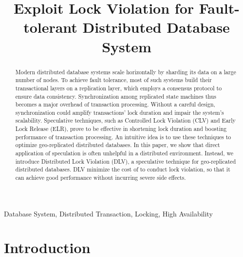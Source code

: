 \documentclass[conference]{IEEEtran}
\begin{document}
\title{Exploit Lock Violation for Fault-tolerant Distributed Database System}


\author{
\and
{}
}

\maketitle

\begin{abstract}
Modern distributed database systems scale horizontally by sharding its data on a large number of nodes.
To achieve fault tolerance, most of such systems build their transactional layers on a replication layer,
which employs a consensus protocol to ensure data consistency.
Synchronization among replicated state machines thus becomes a major overhead of transaction processing.
Without a careful design, synchronization could amplify transactions' lock duration and impair the system's scalability.
Speculative techniques, such as Controlled Lock Violation (CLV) and Early Lock Release (ELR), prove to be effective in shortening lock duration and boosting performance of transaction processing.
An intuitive idea is to use these techniques to optimize geo-replicated distributed databases.
In this paper, we show that direct application of speculation is often unhelpful in a distributed environment.
Instead, we introduce Distributed Lock Violation (DLV), a speculative technique for geo-replicated distributed databases.
DLV minimize the cost of to conduct lock violation, so that it can achieve good performance without incurring severe side effects.
\end{abstract}

\begin{IEEEkeywords}
Database System, Distributed Transaction, Locking, High Availability
\end{IEEEkeywords}

\section{Introduction}
\end{document}

